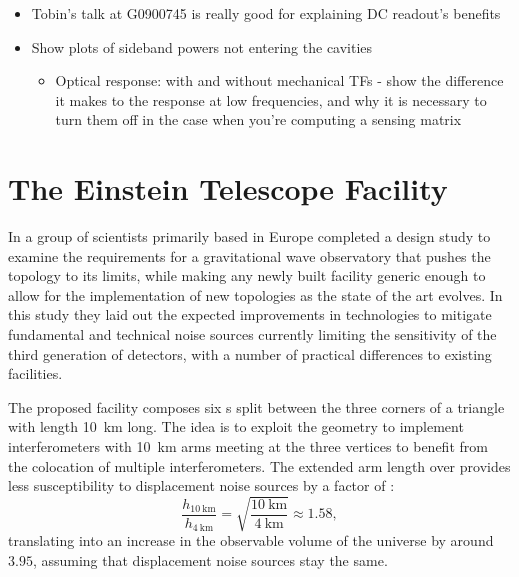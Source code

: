 \begin{itemize}
  \item Tobin's talk at G0900745 is really good for explaining DC readout's benefits
  
  \item Show plots of sideband powers not entering the cavities

	\begin{itemize}
	  \item Optical response: with and without mechanical TFs - show the difference it makes to the response at low frequencies, and why it is necessary to turn them off in the case when you're computing a sensing matrix
	\end{itemize}
\end{itemize}

\section{The Einstein Telescope Facility}
In  a group of scientists primarily based in Europe completed a design study to examine the requirements for a gravitational wave observatory that pushes the \MI{} topology to its limits, while making any newly built facility generic enough to allow for the implementation of new topologies as the state of the art evolves. In this study they laid out the expected improvements in technologies to mitigate fundamental and technical noise sources currently limiting the sensitivity of the third generation of detectors, with a number of practical differences to existing facilities.

The proposed \ET{} facility composes six \DRFPMI{}s split between the three corners of a triangle with length \SI{10}{\kilo\meter} long. The idea is to exploit the geometry to implement interferometers with \SI{10}{\kilo\meter} arms meeting at the three vertices to benefit from the colocation of multiple interferometers. The extended arm length over \ALIGO{} provides less susceptibility to displacement noise sources by a factor of \cite{Dwyer2015, aligocosmic2016}:
\begin{equation}
  \frac{h_{\SI{10}{\kilo\meter}}}{h_{\SI{4}{\kilo\meter}}} = \sqrt{\frac{\SI{10}{\kilo\meter}}{\SI{4}{\kilo\meter}}} \approx 1.58,
\end{equation}
translating into an increase in the observable volume of the universe by around $3.95$, assuming that displacement noise sources stay the same.

